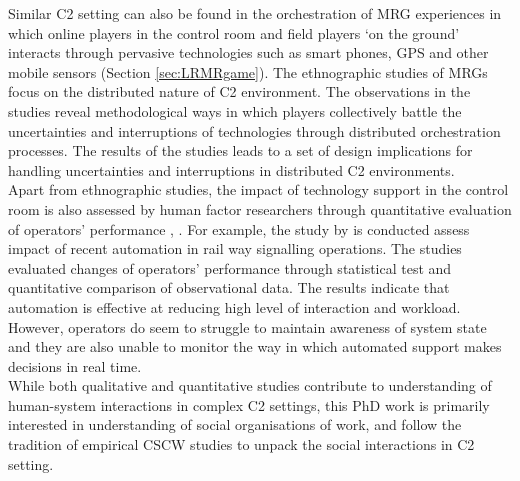 Similar \ac{C2} setting can also be found in the orchestration of \acf{MRG} experiences in which online players in the control room and field players `on the ground' interacts through pervasive technologies such as smart phones, GPS and other mobile sensors (Section \ref{sec:LRMRgame}). The ethnographic studies of \ac{MRG}s \cite{Benford2006,Crabtree2004,Koleva2001} focus on the distributed nature of \ac{C2} environment. The observations in the studies reveal methodological ways in which players collectively battle the uncertainties and interruptions of technologies through distributed orchestration processes. The results of the studies leads to a set of design implications for handling uncertainties and interruptions in distributed \ac{C2} environments. \\

Apart from ethnographic studies, the impact of technology support in the control room is also assessed by human factor researchers through quantitative evaluation of operators' performance \citep{Grootjen2007}, \citep{Sharples2011}. For example, the study by \cite{Sharples2011} is conducted assess impact of recent automation in rail way signalling operations. The studies evaluated changes of operators' performance through statistical test and quantitative comparison of observational data. The results indicate that automation is effective at reducing high level of interaction and workload. However, operators do seem to struggle to maintain awareness of system state and they are also unable to monitor the way in which automated support makes decisions in real time. \\

While both qualitative and quantitative studies contribute to understanding of human-system interactions in complex \ac{C2} settings, this PhD work is primarily interested in understanding of social organisations of work, and follow the tradition of empirical \ac{CSCW} studies to unpack the social interactions in \ac{C2} setting. \\



